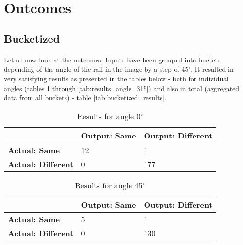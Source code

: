 \section{Outcomes}
\subsection{Bucketized}
\paragraph{}
Let us now look at the outcomes. Inputs have been grouped into buckets depending of the angle of the rail in the image by a step of 45$^{\circ}$. It resulted in very satisfying results as presented in the tables below - both for individual angles (tables \ref{tab:results_angle_0} through \ref{tab:results_angle_315}) and also in total (aggregated data from all buckets) - table \ref{tab:bucketized_results}.

\begin{table}[H]
    \centering
	\begin{spacing}{1.5}    
    \begin{tabular}{|l|l|l|}
        \hline
        \cellcolor{gray} & \textbf{Output: Same} & \textbf{Output: Different} \\ [0.5ex]
        \hline\hline
        \textbf{Actual: Same} & 12 & 1 \\ [0.5ex]
        \hline
        \textbf{Actual: Different} & 0 & 177 \\ [0.5ex]
        \hline
    \end{tabular}
    \end{spacing}
    \caption{Results for angle 0$^{\circ}$}
    \label{tab:results_angle_0}
\end{table}
            
\begin{table}[H]
    \centering
	\begin{spacing}{1.5}    
    \begin{tabular}{|l|l|l|}
        \hline
        \cellcolor{gray} & \textbf{Output: Same} & \textbf{Output: Different} \\ [0.5ex]
        \hline\hline
        \textbf{Actual: Same} & 5 & 1 \\ [0.5ex]
        \hline
        \textbf{Actual: Different} & 0 & 130 \\ [0.5ex]
        \hline
    \end{tabular}
    \end{spacing}
    \caption{Results for angle 45$^{\circ}$}
\end{table}
            
